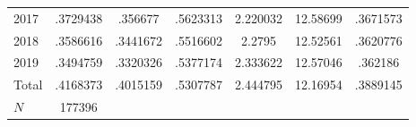 {\begin{longtable}{l*{1}{cccccc}}
2017        &    .3729438&     .356677&    .5623313&    2.220032&    12.58699&    .3671573\\
2018        &    .3586616&    .3441672&    .5516602&      2.2795&    12.52561&    .3620776\\
2019        &    .3494759&    .3320326&    .5377174&    2.333622&    12.57046&     .362186\\
Total       &    .4168373&    .4015159&    .5307787&    2.444795&    12.16954&    .3889145\\
\hline
\(N\)       &      177396&            &            &            &            &            \\
\hline\hline
\end{longtable}
}

